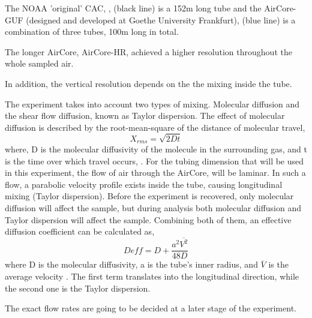 \documentclass[a4paper,12pt,twoside]{article}
\begin{document}
The NOAA 'original' CAC, \cite{Karion}, (black line) is a 152m long tube and the AirCore-GUF (designed and developed at Goethe University Frankfurt), (blue line) is a combination of three tubes, 100m long in total.

The longer AirCore, AirCore-HR, achieved a higher resolution throughout the whole sampled air. 

In addition, the vertical resolution depends on the the mixing inside the tube. 

The experiment takes into account two types of mixing. Molecular diffusion and the shear flow diffusion, known as Taylor dispersion. The effect of molecular diffusion is described by the root-mean-square of the distance of molecular travel, 
\begin{equation}
    X_{rms} = \sqrt{2Dt}
\end{equation}
where, D is the molecular diffusivity of the molecule in the surrounding gas, and t is the time over which travel occurs, \cite{Karion}.
For the tubing dimension that will be used in this experiment, the flow of air through the AirCore, will be laminar. In such a flow, a parabolic velocity profile exists inside the tube, causing longitudinal mixing (Taylor dispersion). 
 Before the experiment is recovered, only molecular diffusion will affect the sample, but during analysis both molecular diffusion and Taylor dispersion will affect the sample.
 Combining both of them, an effective diffusion coefficient can be calculated as,
 \begin{equation}
     D{eff} = D + \frac{a^2\overline{V^2}}{48D}
 \end{equation}
where D is the molecular diffusivity, a is the tube's inner radius, and $\overline{V}$ is the average velocity \cite{Olivier}. The first term translates into the longitudinal direction, while the second one is the Taylor dispersion.

The exact flow rates are going to be decided at a later stage of the experiment.
\end{document}
